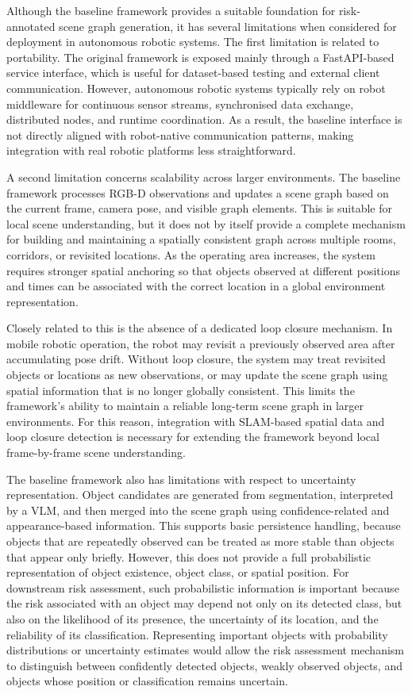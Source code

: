 {\small

Although the baseline framework provides a suitable foundation for risk-annotated scene graph generation, it has several limitations when considered for deployment in autonomous robotic systems. The first limitation is related to portability. The original framework is exposed mainly through a FastAPI-based service interface, which is useful for dataset-based testing and external client communication. However, autonomous robotic systems typically rely on robot middleware for continuous sensor streams, synchronised data exchange, distributed nodes, and runtime coordination. As a result, the baseline interface is not directly aligned with robot-native communication patterns, making integration with real robotic platforms less straightforward.

A second limitation concerns scalability across larger environments. The baseline framework processes RGB-D observations and updates a scene graph based on the current frame, camera pose, and visible graph elements. This is suitable for local scene understanding, but it does not by itself provide a complete mechanism for building and maintaining a spatially consistent graph across multiple rooms, corridors, or revisited locations. As the operating area increases, the system requires stronger spatial anchoring so that objects observed at different positions and times can be associated with the correct location in a global environment representation.

Closely related to this is the absence of a dedicated loop closure mechanism. In mobile robotic operation, the robot may revisit a previously observed area after accumulating pose drift. Without loop closure, the system may treat revisited objects or locations as new observations, or may update the scene graph using spatial information that is no longer globally consistent. This limits the framework's ability to maintain a reliable long-term scene graph in larger environments. For this reason, integration with SLAM-based spatial data and loop closure detection is necessary for extending the framework beyond local frame-by-frame scene understanding.

The baseline framework also has limitations with respect to uncertainty representation. Object candidates are generated from segmentation, interpreted by a VLM, and then merged into the scene graph using confidence-related and appearance-based information. This supports basic persistence handling, because objects that are repeatedly observed can be treated as more stable than objects that appear only briefly. However, this does not provide a full probabilistic representation of object existence, object class, or spatial position. For downstream risk assessment, such probabilistic information is important because the risk associated with an object may depend not only on its detected class, but also on the likelihood of its presence, the uncertainty of its location, and the reliability of its classification. Representing important objects with probability distributions or uncertainty estimates would allow the risk assessment mechanism to distinguish between confidently detected objects, weakly observed objects, and objects whose position or classification remains uncertain.

}
